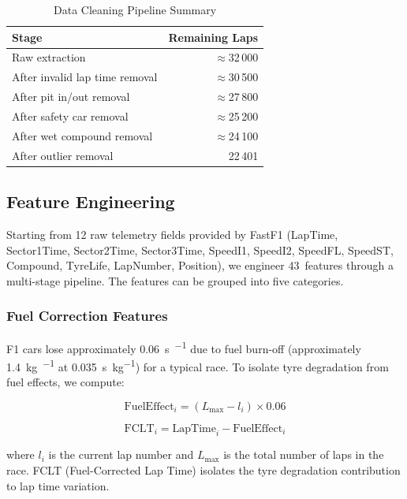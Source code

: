 \documentclass[journal,twoside]{IEEEtran}
\begin{document}
\begin{table}[!t]
\caption{Data Cleaning Pipeline Summary}
\label{tab:cleaning}
\centering
\footnotesize
\begin{tabular}{@{}lr@{}}
\toprule
\textbf{Stage} & \textbf{Remaining Laps} \\
\midrule
Raw extraction & $\approx$32\,000 \\
After invalid lap time removal & $\approx$30\,500 \\
After pit in/out removal & $\approx$27\,800 \\
After safety car removal & $\approx$25\,200 \\
After wet compound removal & $\approx$24\,100 \\
After outlier removal & 22\,401 \\
\bottomrule
\end{tabular}
\end{table}

\subsection{Feature Engineering}\label{sec:features}

Starting from 12 raw telemetry fields provided by FastF1 (LapTime,
Sector1Time, Sector2Time, Sector3Time, SpeedI1, SpeedI2, SpeedFL,
SpeedST, Compound, TyreLife, LapNumber, Position), we engineer
43~features through a multi-stage pipeline.  The features can be
grouped into five categories.

\subsubsection{Fuel Correction Features}

F1 cars lose approximately \SI{0.06}{\second\per{}} due to
fuel burn-off (approximately \SI{1.4}{\kilo\gram\per{}} at
\SI{0.035}{\second\per\kilo\gram}) for a typical race.  To isolate
tyre degradation from fuel effects, we compute:

\begin{equation}
  \text{FuelEffect}_i = (L_{\max} - l_i) \times 0.06
  \label{eq:fuel_effect}
\end{equation}

\begin{equation}
  \text{FCLT}_i = \text{LapTime}_i - \text{FuelEffect}_i
  \label{eq:fclt}
\end{equation}

\noindent where $l_i$ is the current lap number and $L_{\max}$ is the
total number of laps in the race.  FCLT (Fuel-Corrected Lap Time)
isolates the tyre degradation contribution to lap time variation.
\end{document}
